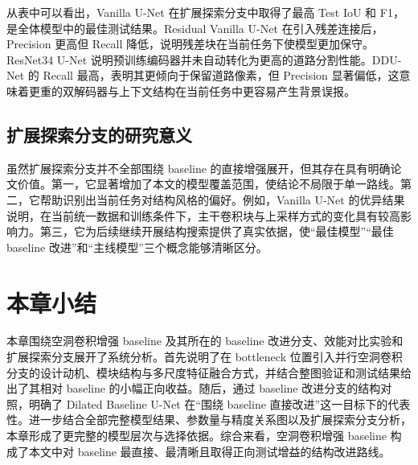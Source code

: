 从表中可以看出，Vanilla U-Net 在扩展探索分支中取得了最高 Test IoU 和 F1，是全体模型中的最佳测试结果。Residual Vanilla U-Net 在引入残差连接后，Precision 更高但 Recall 降低，说明残差块在当前任务下使模型更加保守。ResNet34 U-Net 说明预训练编码器并未自动转化为更高的道路分割性能。DDU-Net 的 Recall 最高，表明其更倾向于保留道路像素，但 Precision 显著偏低，这意味着更重的双解码器与上下文结构在当前任务中更容易产生背景误报。

\subsection{扩展探索分支的研究意义}
虽然扩展探索分支并不全部围绕 baseline 的直接增强展开，但其存在具有明确论文价值。第一，它显著增加了本文的模型覆盖范围，使结论不局限于单一路线。第二，它帮助识别出当前任务对结构风格的偏好。例如，Vanilla U-Net 的优异结果说明，在当前统一数据和训练条件下，主干卷积块与上采样方式的变化具有较高影响力。第三，它为后续继续开展结构搜索提供了真实依据，使“最佳模型”“最佳 baseline 改进”和“主线模型”三个概念能够清晰区分。

\section{本章小结}
本章围绕空洞卷积增强 baseline 及其所在的 baseline 改进分支、效能对比实验和扩展探索分支展开了系统分析。首先说明了在 bottleneck 位置引入并行空洞卷积分支的设计动机、模块结构与多尺度特征融合方式，并结合整图验证和测试结果给出了其相对 baseline 的小幅正向收益。随后，通过 baseline 改进分支的结构对照，明确了 Dilated Baseline U-Net 在“围绕 baseline 直接改进”这一目标下的代表性。进一步结合全部完整模型结果、参数量与精度关系图以及扩展探索分支分析，本章形成了更完整的模型层次与选择依据。综合来看，空洞卷积增强 baseline 构成了本文中对 baseline 最直接、最清晰且取得正向测试增益的结构改进路线。
